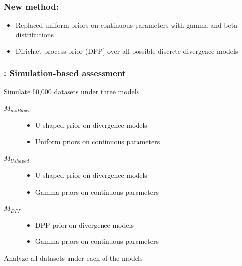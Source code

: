 \begin{frame}
    \frametitle{New method: \dppmsbayes}
    \begin{itemize}
        \item<1-> Replaced uniform priors on continuous parameters with gamma and
            beta distributions
        \item<1-> Dirichlet process prior (DPP) over all possible discrete divergence
            models
    \end{itemize}
\end{frame}

\begin{frame}
    \frametitle{\dppmsbayes: Simulation-based assessment}
        Simulate 50,000 datasets under three models\\
        \smallskip
        \begin{description}
            \item[$M_{msBayes}$]
                \begin{itemize}
                    \item U-shaped prior on divergence models
                    \item Uniform priors on continuous parameters
                \end{itemize}
            \smallskip
            \item[$M_{Ushaped}$]
                \begin{itemize}
                    \item U-shaped prior on divergence models
                    \item Gamma priors on continuous parameters
                \end{itemize}
            \smallskip
            \item[$M_{DPP}$]
                \begin{itemize}
                    \item DPP prior on divergence models
                    \item Gamma priors on continuous parameters
                \end{itemize}
        \end{description}
        \smallskip
        Analyze all datasets under each of the models
\end{frame}

